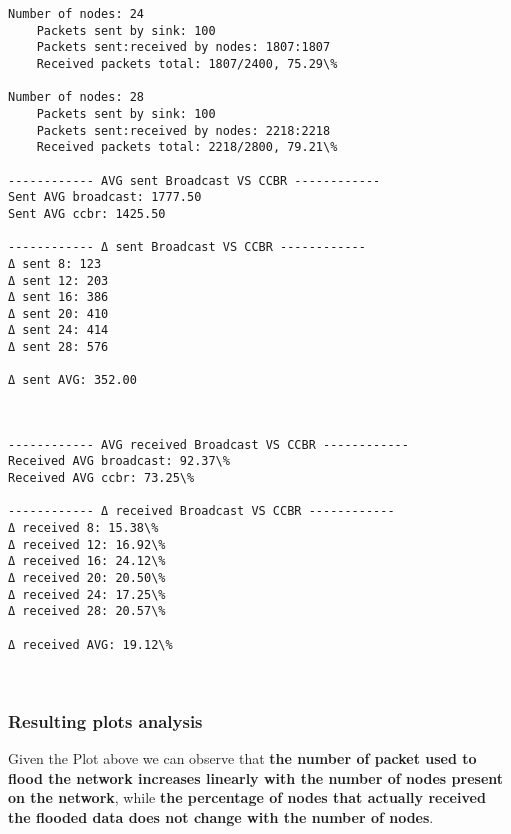 \documentclass[11pt]{article}
\begin{document}
\begin{Verbatim}[commandchars=\\\{\}]
Number of nodes: 24
	Packets sent by sink: 100
	Packets sent:received by nodes: 1807:1807
	Received packets total: 1807/2400, 75.29\%

Number of nodes: 28
	Packets sent by sink: 100
	Packets sent:received by nodes: 2218:2218
	Received packets total: 2218/2800, 79.21\%

------------ AVG sent Broadcast VS CCBR ------------
Sent AVG broadcast: 1777.50
Sent AVG ccbr: 1425.50

------------ Δ sent Broadcast VS CCBR ------------
Δ sent 8: 123
Δ sent 12: 203
Δ sent 16: 386
Δ sent 20: 410
Δ sent 24: 414
Δ sent 28: 576

Δ sent AVG: 352.00

    \end{Verbatim}

    \begin{center}
    \end{center}
    { \hspace*{\fill} \\}
    
    \begin{Verbatim}[commandchars=\\\{\}]
------------ AVG received Broadcast VS CCBR ------------
Received AVG broadcast: 92.37\%
Received AVG ccbr: 73.25\%

------------ Δ received Broadcast VS CCBR ------------
Δ received 8: 15.38\%
Δ received 12: 16.92\%
Δ received 16: 24.12\%
Δ received 20: 20.50\%
Δ received 24: 17.25\%
Δ received 28: 20.57\%

Δ received AVG: 19.12\%

    \end{Verbatim}

    \begin{center}
    \end{center}
    { \hspace*{\fill} \\}
    
    \hypertarget{resulting-plots-analysis}{%
\subsubsection{Resulting plots
analysis}\label{resulting-plots-analysis}}

Given the Plot above we can observe that \textbf{the number of packet
used to flood the network increases linearly with the number of nodes
present on the network}, while \textbf{the percentage of nodes that
actually received the flooded data does not change with the number of
nodes}.
\end{document}
